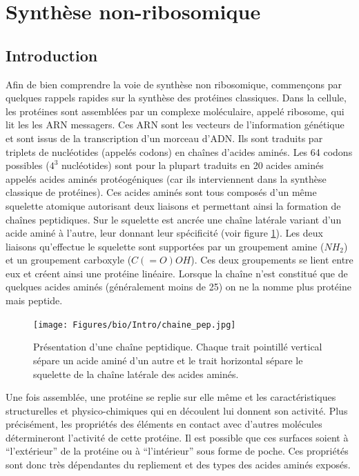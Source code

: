 \section{Synthèse non-ribosomique}
\label{bio_NRP}

\subsection{Introduction}
\label{intro_bio}

Afin de bien comprendre la voie de synthèse non ribosomique, commençons par quelques rappels rapides sur la synthèse des protéines classiques.
Dans la cellule, les protéines sont assemblées par un complexe moléculaire, appelé ribosome, qui lit les  les ARN messagers.
Ces ARN sont les vecteurs de l’information génétique et sont issus de la transcription d’un morceau d’ADN.
Ils sont traduits par triplets de nucléotides (appelés codons) en chaînes d’acides aminés.
Les 64 codons possibles ($4^3$ nucléotides) sont pour la plupart traduits en 20 acides aminés appelés acides aminés protéogéniques (car ils interviennent dans la synthèse classique de protéines).
Ces acides aminés sont tous composés d'un même squelette atomique autorisant deux liaisons et permettant ainsi la formation de chaînes peptidiques.
Sur le squelette est ancrée une chaîne latérale variant d'un acide aminé à l'autre, leur donnant leur spécificité (voir figure \ref{chaine_pep}).
Les deux liaisons qu'effectue le squelette sont supportées par un groupement amine ($NH_2$) et un groupement carboxyle ($C(=O)OH$).
Ces deux groupements se lient entre eux et créent ainsi une protéine linéaire.
Lorsque la chaîne n'est constitué que de quelques acides aminés (généralement moins de 25) on ne la nomme plus protéine mais peptide.

\begin{figure}[h!]
  \begin{center}
    \texttt{[image: Figures/bio/Intro/chaine\_pep.jpg]}
    \caption{\label{chaine_pep}Présentation d'une chaîne peptidique.
    Chaque trait pointillé vertical sépare un acide aminé d'un autre et le trait horizontal sépare le squelette de la chaîne latérale des acides aminés.}
  \end{center}
\end{figure}

Une fois assemblée, une protéine se replie sur elle même et les caractéristiques structurelles et physico-chimiques qui en découlent lui donnent son activité.
Plus précisément, les propriétés des éléments en contact avec d'autres molécules détermineront l'activité de cette protéine.
Il est possible que ces surfaces soient à ``l'extérieur'' de la protéine ou à ``l'intérieur'' sous forme de poche.
Ces propriétés sont donc très dépendantes du repliement et des types des acides aminés exposés.



